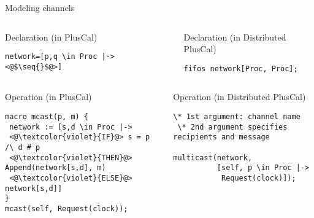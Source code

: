 \documentclass{beamer}
\newcommand{\seq}[1]{\langle #1 \rangle}
\begin{document}
\begin{frame}[fragile]{Modeling channels}

\begin{columns}
\begin{column}{0.52\textwidth}
\begin{exampleblock}{Declaration (in PlusCal)}
        \begin{lstlisting}[language=pluscal, frame = none, numbers = none]
network=[p,q \in Proc |-> <@$\seq{}$@>] 
\end{lstlisting}
\end{exampleblock}
\end{column}
\pause

\begin{column}{0.57\textwidth}
\begin{exampleblock}{Declaration (in Distributed PlusCal)}
 \begin{lstlisting}[language=pluscal, frame = none, numbers = none]
fifos network[Proc, Proc];\end{lstlisting}
\end{exampleblock}
\end{column}
\pause
\end{columns}

\begin{columns}
\begin{column}{0.52\textwidth}
\begin{exampleblock}{Operation (in PlusCal)}
        \begin{lstlisting}[language=pluscal, frame = none, numbers = none]
macro mcast(p, m) {
 network := [s,d \in Proc |-> 
 <@\textcolor{violet}{IF}@> s = p /\ d # p 
 <@\textcolor{violet}{THEN}@> Append(network[s,d], m) 
 <@\textcolor{violet}{ELSE}@> network[s,d]]
}
mcast(self, Request(clock));\end{lstlisting}
\end{exampleblock}
\end{column}
\pause

\begin{column}{0.57\textwidth}
\begin{exampleblock}{Operation (in Distributed PlusCal)}
 \begin{lstlisting}[language=pluscal, frame = none, numbers = none]
 \* 1st argument: channel name
 \* 2nd argument specifies recipients and message
 
multicast(network, 
          [self, p \in Proc |-> 
           Request(clock)]);
\end{lstlisting}
\newline

\end{exampleblock}
\end{column}
\end{columns}
\end{frame}
\end{document}
